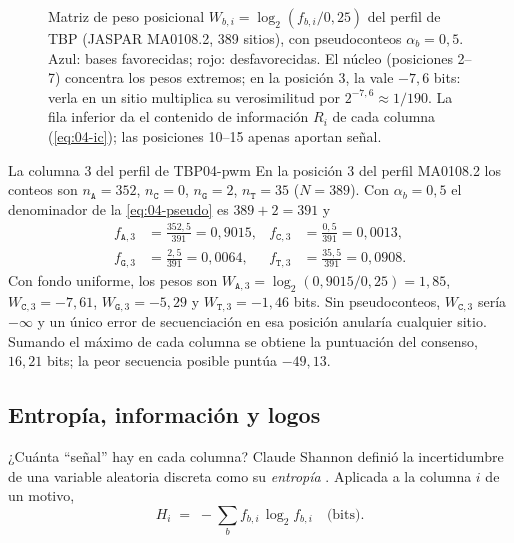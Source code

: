 \begin{figure}[tbp]
\centering

\caption[PWM del sitio de unión de TBP]{Matriz de peso posicional $W_{b,i}=\log_2(f_{b,i}/0{,}25)$ del perfil de TBP (JASPAR MA0108.2, 389 sitios), con pseudoconteos $\alpha_b=0{,}5$. Azul: bases favorecidas; rojo: desfavorecidas. El núcleo  (posiciones 2--7) concentra los pesos extremos; en la posición 3, la  vale $-7{,}6$ bits: verla en un sitio multiplica su verosimilitud por $2^{-7{,}6}\approx 1/190$. La fila inferior da el contenido de información $R_i$ de cada columna (\cref{eq:04-ic}); las posiciones 10--15 apenas aportan señal.}
\label{fig:04-pwm}
\end{figure}

\begin{ejemplo}{La columna 3 del perfil de TBP}{04-pwm}
En la posición 3 del perfil MA0108.2 los conteos son $n_{\texttt{A}}=352$, $n_{\texttt{C}}=0$, $n_{\texttt{G}}=2$, $n_{\texttt{T}}=35$ ($N=389$). Con $\alpha_b=0{,}5$ el denominador de la \cref{eq:04-pseudo} es $389+2=391$ y
\begin{align*}
f_{\texttt{A},3}&=\tfrac{352{,}5}{391}=0{,}9015, & f_{\texttt{C},3}&=\tfrac{0{,}5}{391}=0{,}0013,\\
f_{\texttt{G},3}&=\tfrac{2{,}5}{391}=0{,}0064, & f_{\texttt{T},3}&=\tfrac{35{,}5}{391}=0{,}0908.
\end{align*}
Con fondo uniforme, los pesos son $W_{\texttt{A},3}=\log_2(0{,}9015/0{,}25)=1{,}85$, $W_{\texttt{C},3}=-7{,}61$, $W_{\texttt{G},3}=-5{,}29$ y $W_{\texttt{T},3}=-1{,}46$ bits. Sin pseudoconteos, $W_{\texttt{C},3}$ sería $-\infty$ y un único error de secuenciación en esa posición anularía cualquier sitio. Sumando el máximo de cada columna se obtiene la puntuación del consenso, $16{,}21$ bits; la peor secuencia posible puntúa $-49{,}13$.
\end{ejemplo}

\subsection{Entropía, información y logos}

¿Cuánta ``señal'' hay en cada columna? Claude Shannon definió la incertidumbre de una variable aleatoria discreta como su \emph{entropía} \parencite{c04-shannon1948}. Aplicada a la columna $i$ de un motivo,
\begin{equation}\label{eq:04-entropia}
H_i \;=\; -\sum_{b} f_{b,i}\,\log_2 f_{b,i}\quad\text{(bits)}.
\end{equation}

